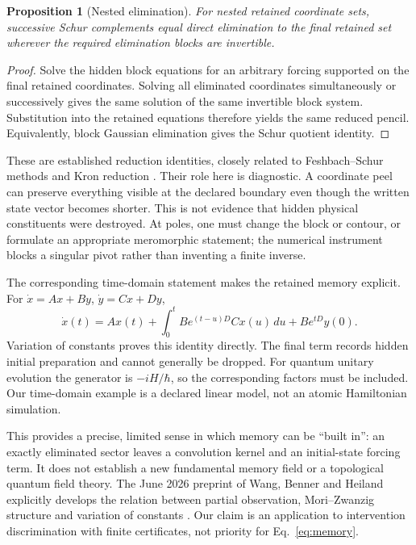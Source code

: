 \documentclass[11pt]{article}
\newtheorem{proposition}{Proposition}
\begin{document}
\begin{proposition}[Nested elimination]
For nested retained coordinate sets, successive Schur complements equal direct elimination to the final retained set wherever the required elimination blocks are invertible.
\end{proposition}
\begin{proof}
Solve the hidden block equations for an arbitrary forcing supported on the final retained coordinates. Solving all eliminated coordinates simultaneously or successively gives the same solution of the same invertible block system. Substitution into the retained equations therefore yields the same reduced pencil. Equivalently, block Gaussian elimination gives the Schur quotient identity.
\end{proof}

These are established reduction identities, closely related to Feshbach--Schur methods and Kron reduction \cite{feshbach,kron}. Their role here is diagnostic. A coordinate peel can preserve everything visible at the declared boundary even though the written state vector becomes shorter. This is not evidence that hidden physical constituents were destroyed. At poles, one must change the block or contour, or formulate an appropriate meromorphic statement; the numerical instrument blocks a singular pivot rather than inventing a finite inverse.

The corresponding time-domain statement makes the retained memory explicit. For $\dot x=Ax+By$, $\dot y=Cx+Dy$,
\begin{equation}
\dot x(t)=Ax(t)+\int_0^t B e^{(t-u)D}C x(u)\,du+B e^{tD}y(0).
\label{eq:memory}
\end{equation}
Variation of constants proves this identity directly. The final term records hidden initial preparation and cannot generally be dropped. For quantum unitary evolution the generator is $-iH/\hbar$, so the corresponding factors must be included. Our time-domain example is a declared linear model, not an atomic Hamiltonian simulation.

This provides a precise, limited sense in which memory can be ``built in'': an exactly eliminated sector leaves a convolution kernel and an initial-state forcing term. It does not establish a new fundamental memory field or a topological quantum field theory. The June 2026 preprint of Wang, Benner and Heiland explicitly develops the relation between partial observation, Mori--Zwanzig structure and variation of constants \cite{mz}. Our claim is an application to intervention discrimination with finite certificates, not priority for Eq.~\eqref{eq:memory}.
\end{document}
